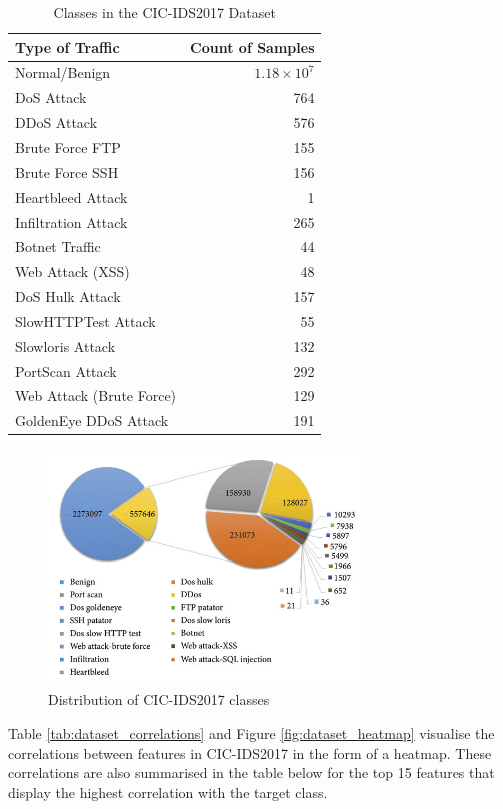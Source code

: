 \begin{table}[h] 
\centering 
\caption{Classes in the CIC-IDS2017 Dataset} 
\label{tab:dataset_classes} 
\begin{tabular}{lr} 
\toprule 
Type of Traffic & Count of Samples \\ 
\midrule 
Normal/Benign & $1.18\times10^7$ \\ 
DoS Attack & 764 \\ 
DDoS Attack & 576 \\ 
Brute Force FTP & 155 \\ 
Brute Force SSH & 156 \\ 
Heartbleed Attack & 1 \\ 
Infiltration Attack & 265 \\ 
Botnet Traffic & 44 \\ 
Web Attack (XSS) & 48 \\ 
DoS Hulk Attack & 157 \\ 
SlowHTTPTest Attack & 55 \\ 
Slowloris Attack & 132 \\ 
PortScan Attack & 292 \\ 
Web Attack (Brute Force) & 129 \\ 
GoldenEye DDoS Attack & 191 \\ 
\bottomrule 
\end{tabular} 
\end{table} 

\begin{figure}[H] 
\centering 
\includegraphics[width=0.75\textwidth]{assets/figures/dataset_distr.jpg} 
\caption{Distribution of CIC-IDS2017 classes} 
\label{fig:dataset_distr} 
\end{figure} 
\parencite{article5672}

Table \ref{tab:dataset_correlations} and Figure \ref{fig:dataset_heatmap} visualise the correlations between features in CIC-IDS2017 in the form of a heatmap. These correlations are also summarised in the table below for the top 15 features that display the highest correlation with the target class.

